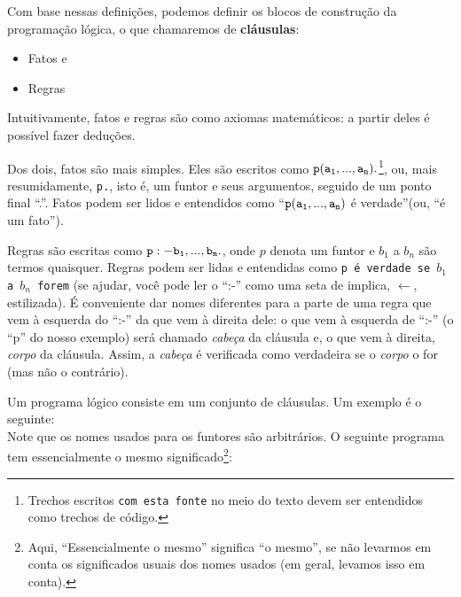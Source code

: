 \documentclass{article}
\begin{document}
Com base nessas definições, podemos definir os blocos de construção da programação lógica, o que chamaremos de \textbf{cláusulas}:
\begin{itemize}
  \item Fatos e
  \item Regras
\end{itemize}

Intuitivamente, fatos e regras são como axiomas matemáticos: a partir deles é possível fazer deduções.

Dos dois, fatos são mais simples. Eles são escritos como  ${\tt p(a_1, ..., a_n).}$\footnote{Trechos escritos {\tt com esta fonte} no meio do texto devem ser entendidos como trechos de código.},  ou, mais resumidamente, {\tt p.}, isto é, um funtor e seus argumentos, seguido de um ponto final ``.''. Fatos podem ser lidos e entendidos como ``${\tt p(a_1, ..., a_n)}$ é verdade''(ou, ``é um fato'').

Regras são escritas como ${\tt p :- b_1, ..., b_n.}$, onde $p$ denota um funtor e $b_1$ a $b_n$ são termos quaisquer. Regras podem ser lidas e entendidas como {\tt p é verdade se $b_1$ a $b_n$ forem} (se ajudar, você pode ler o ``:-'' como uma seta de implica, $\leftarrow$, estilizada). É conveniente dar nomes diferentes para a parte de uma regra que vem à esquerda do ``:-'' da que vem à direita dele: o que vem à esquerda de ``:-'' (o ``p'' do nosso exemplo) será chamado \textit{cabeça} da cláusula e, o que vem à direita, \textit{corpo} da cláusula. Assim, a
\textit{cabeça} é verificada como verdadeira se o \textit{corpo} o for (mas não o contrário).

Um programa lógico consiste em um conjunto de cláusulas. Um exemplo é o seguinte:\\



Note que os nomes usados para os funtores são arbitrários. O seguinte programa tem essencialmente o mesmo significado\footnote{ Aqui, ``Essencialmente o mesmo'' significa ``o mesmo'', se não levarmos em conta os significados usuais dos nomes usados (em geral, levamos isso em conta).}:\\


\end{document}
